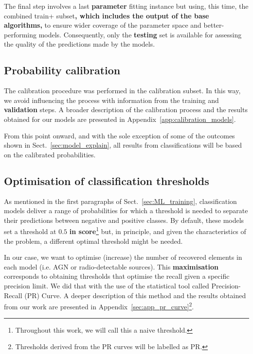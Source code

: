 \documentclass{aa}
\begin{document}
The final step involves a last \textbf{parameter} fitting instance but using, this time, the combined train+ subset\textbf{, which includes the output of the base algorithms,} to ensure wider coverage of the parameter space and better-performing models. Consequently, only the \textbf{testing} set is available for assessing the quality of the predictions made by the models.

\subsection{Probability calibration}\label{sec:prob_calibration}

The calibration procedure was performed in the calibration subset. In this way, we avoid influencing the process with information from the training and \textbf{validation} steps. A broader description of the calibration process and the results obtained for our models are presented in Appendix~\ref{app:calibration_models}.

From this point onward, and with the sole exception of some of the outcomes shown in Sect.~\ref{sec:model_explain}, all results from classifications will be based on the calibrated probabilities.

\subsection{Optimisation of classification thresholds}\label{sec:threshold_opt}

As mentioned in the first paragraphs of Sect.~\ref{sec:ML_training}, classification models deliver a range of probabilities for which a threshold is needed to separate their predictions between negative and positive classes. By default, these models set a threshold at $0.5$ \textbf{in score}\footnote{Throughout this work, we will call this a naive threshold.} but, in principle, and given the characteristics of the problem, a different optimal threshold might be needed.

In our case, we want to optimise (increase) the number of recovered elements in each model (i.e. AGN or radio-detectable sources). This \textbf{maximisation} corresponds to obtaining thresholds that optimise the recall given a specific precision limit. We did that with the use of the statistical tool called Precision-Recall (PR) Curve. A deeper description of this method and the results obtained from our work are presented in Appendix~\ref{sec:app_pr_curve}\footnote{Thresholds derived from the PR curves will be labelled as PR.}.
\end{document}
